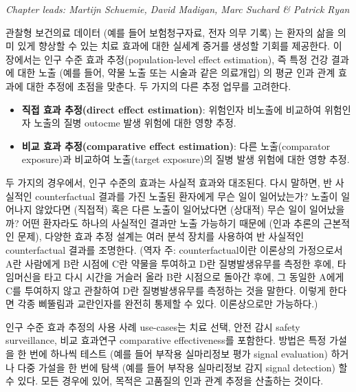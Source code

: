 \documentclass[11pt]{book}
\providecommand{\tightlist}{%
  \setlength{\itemsep}{0pt}\setlength{\parskip}{0pt}}
\theoremstyle{definition}
\theoremstyle{definition}
\theoremstyle{definition}
\theoremstyle{remark}
\begin{document}
\emph{Chapter leads: Martijn Schuemie, David Madigan, Marc Suchard \&
Patrick Ryan}


관찰형 보건의료 데이터 (예를 들어 보험청구자료, 전자 의무 기록) 는
환자의 삶을 의미 있게 향상할 수 있는 치료 효과에 대한 실세계 증거를
생성할 기회를 제공한다. 이 장에서는 인구 수준 효과 추정(population-level
effect estimation), 즉 특정 건강 결과에 대한 노출 (예를 들어, 약물 노출
또는 시술과 같은 의료개입) 의 평균 인과 관계 효과에 대한 추정에 초점을
맞춘다. 두 가지의 다른 추정 업무를 고려한다.

\begin{itemize}
\tightlist
\item
  \textbf{직접 효과 추정(direct effect estimation)}: 위험인자 비노출에
  비교하여 위험인자 노출의 질병 outocme 발생 위험에 대한 영향 추정.
\item
  \textbf{비교 효과 추정(comparative effect estimation)}: 다른
  노출(comparator exposure)과 비교하여 노출(target exposure)의 질병 발생
  위험에 대한 영향 추정. 
\end{itemize}

두 가지의 경우에서, 인구 수준의 효과는 사실적 효과와 대조된다. 다시
말하면, 반 사실적인 counterfactual 결과를 가진 노출된 환자에게 무슨 일이
일어났는가? 노출이 일어나지 않았다면 (직접적) 혹은 다른 노출이
일어났다면 (상대적) 무슨 일이 일어났을까? 어떤 환자라도 하나의 사실적인
결과만 노출 가능하기 때문에 (인과 추론의 근본적인 문제), 다양한 효과
추정 설계는 여러 분석 장치를 사용하여 반 사실적인 counterfactual 결과를
조명한다. (역자 주: counterfactual이란 이론상의 가정으로서 A란 사람에게
B란 시점에 C란 약물을 투여하고 D란 질병발생유무를 측정한 후에,
타임머신을 타고 다시 시간을 거슬러 올라 B란 시점으로 돌아간 후에, 그
동일한 A에게 C를 투여하지 않고 관찰하여 D란 질병발생유무를 측정하는 것을
말한다. 이렇게 한다면 각종 삐뚤림과 교란인자를 완전히 통제할 수 있다.
이론상으로만 가능하다.) 

인구 수준 효과 추정의 사용 사례 use-cases는 치료 선택, 안전 감시 safety
surveillance, 비교 효과연구 comparative effectiveness를 포함한다. 방법은
특정 가설을 한 번에 하나씩 테스트 (예를 들어 부작용 실마리정보 평가
signal evaluation) 하거나 다중 가설을 한 번에 탐색 (예를 들어 부작용
실마리정보 감지 signal detection) 할 수 있다. 모든 경우에 있어, 목적은
고품질의 인과 관계 추정을 산출하는 것이다. 
\end{document}
